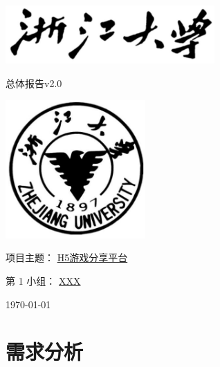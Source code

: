 \documentclass[12pt]{ctexart} %
\begin{document}
\begin{titlepage}
  \centering %
  \includegraphics[width=0.6\textwidth]{zjutitle.jpg} %
  
  \vspace{2cm} %
  
  {\fontsize{36}{48}\selectfont{} 总体报告v2.0} %
  
  \vspace{2cm} %
  
  \includegraphics[width=0.4\textwidth]{zjulogo.jpg} %
  
  \vspace{2cm}
  
  {\Huge{} 项目主题： \underline{H5游戏分享平台}} %
  
  \vspace{1cm}

  {\Large{} 第 1 小组： \underline{XXX}} %
  
  \vspace{1cm} %
  
  {\Large{} \today} %

\end{titlepage}

\newpage
\tableofcontents %
\newpage


\section{需求分析}
\end{document}
